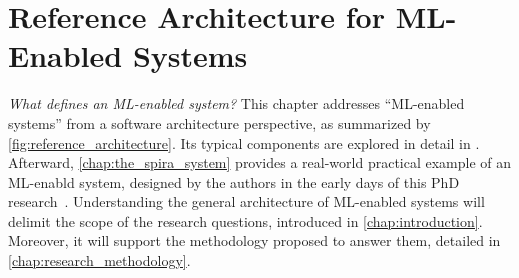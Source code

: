 
\chapter{Reference Architecture for ML-Enabled Systems}
\label{chap:ml_enabled_systems}

\emph{What defines an ML-enabled system?} This chapter addresses
``ML-enabled systems'' from a software architecture perspective,
as summarized by \cref{fig:reference_architecture}.
Its typical components are explored in detail in
.
Afterward, \cref{chap:the_spira_system} provides a real-world practical
example of an ML-enabld system, designed by the authors in the early days
of this PhD research~\parencite{Ferreira2022SPIRA:Detection}.
Understanding the general architecture of ML-enabled systems will delimit
the scope of the research questions, introduced in \cref{chap:introduction}.
Moreover, it will support the methodology proposed to answer them,
detailed in \cref{chap:research_methodology}.



